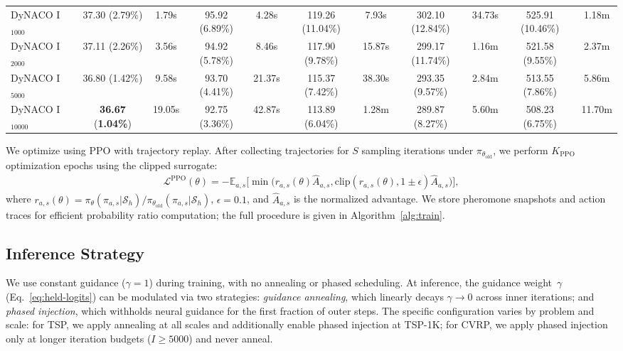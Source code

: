 \documentclass[sigconf]{acmart}
\begin{document}
\begin{table}[t]
{\begin{tabular}{lcccccccccc}
\midrule
DyNACO I$_{1000}$ & 37.30 (2.79\%) & 1.79s & 95.92 (6.89\%) & 4.28s & 119.26 (11.04\%) & 7.93s & 302.10 (12.84\%) & 34.73s & 525.91 (10.46\%) & 1.18m \\
DyNACO I$_{2000}$ & 37.11 (2.26\%) & 3.56s & 94.92 (5.78\%) & 8.46s & 117.90 (9.78\%) & 15.87s & 299.17 (11.74\%) & 1.16m & 521.58 (9.55\%) & 2.37m \\
DyNACO I$_{5000}$ & 36.80 (1.42\%) & 9.58s & 93.70 (4.41\%) & 21.37s & 115.37 (7.42\%) & 38.30s & 293.35 (9.57\%) & 2.84m & 513.55 (7.86\%) & 5.86m \\
DyNACO I$_{10000}$ & \textbf{36.67} (\textbf{1.04\%}) & 19.05s & 92.75 (3.36\%) & 42.87s & 113.89 (6.04\%) & 1.28m & 289.87 (8.27\%) & 5.60m & 508.23 (6.75\%) & 11.70m \\
\bottomrule
\end{tabular}
}
\end{table}

We optimize using PPO with trajectory replay.
After collecting trajectories for $S$ sampling iterations under $\pi_{\theta_{\text{old}}}$, we perform $K_{\text{PPO}}$ optimization epochs using the clipped surrogate:
\begin{multline}
\mathcal{L}^{\text{PPO}}(\theta) = -\mathbb{E}_{a,s}\Big[ \min\big( r_{a,s}(\theta) \hat{A}_{a,s}, 
\text{clip}(r_{a,s}(\theta), 1{\pm}\epsilon) \hat{A}_{a,s} \big) \Big],
\end{multline}
where $r_{a,s}(\theta) = \pi_\theta(\pi_{a,s} | \mathcal{S}_h) / \pi_{\theta_{\text{old}}}(\pi_{a,s} | \mathcal{S}_h)$, $\epsilon=0.1$, and $\hat{A}_{a,s}$ is the normalized advantage.
We store pheromone snapshots and action traces for efficient probability ratio computation; the full procedure is given in Algorithm~\ref{alg:train}.



\subsection{Inference Strategy}
\label{sec:inference}
We use constant guidance ($\gamma{=}1$) during training, with no annealing or phased scheduling.
At inference, the guidance weight~$\gamma$ (Eq.~\ref{eq:held-logits}) can be modulated via two strategies: \emph{guidance annealing}, which linearly decays $\gamma \to 0$ across inner iterations; and \emph{phased injection}, which withholds neural guidance for the first fraction of outer steps.
The specific configuration varies by problem and scale: for TSP, we apply annealing at all scales and additionally enable phased injection at TSP-1K; for CVRP, we apply phased injection only at longer iteration budgets ($I{\geq}5000$) and never anneal.
\end{document}
